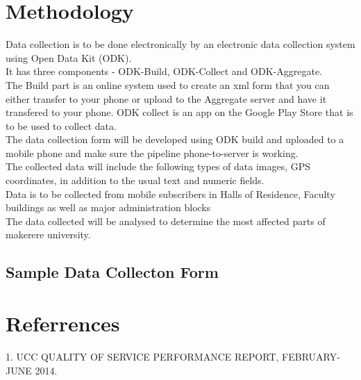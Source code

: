 \documentclass[11pt]{article} %
\begin{document}
\section{Methodology}
 Data collection is to be done electronically by an electronic data collection system using Open Data Kit (ODK).\\It has three components - ODK-Build, ODK-Collect and ODK-Aggregate. \\The Build part is an online system used to create an xml form that you can either transfer to your phone or upload to the Aggregate server and have it transfered to your phone. ODK collect is an app on the Google Play Store that is to be used to collect  data.\\The data collection form  will be developed  using ODK build and uploaded to a mobile phone and make sure the pipeline phone-to-server is working.\\ The collected data will  include the following types of data images, GPS coordinates, in addition to the usual text and numeric fields.\\Data is to be collected from mobile subscribers in Halls of Residence, Faculty buildings as well as major administration blocks\\The data collected will be analysed to determine the most affected parts of makerere university.  
\subsection{Sample Data Collecton Form}
\section{Referrences}
1. UCC QUALITY OF SERVICE PERFORMANCE REPORT, FEBRUARY-JUNE 2014.
\end{document}
